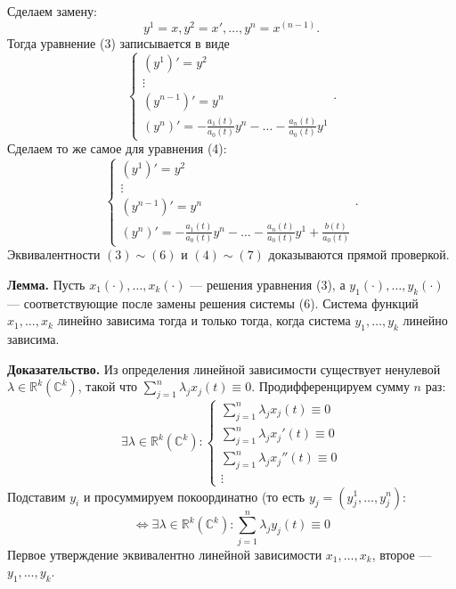 Сделаем замену: 
\begin{equation}
    y^1 = x, y^2 = x', \dots, y^n = x^{(n-1)}.
\end{equation}
Тогда уравнение (3) записывается в виде
\begin{equation}
    \begin{cases}
        (y^1)' = y^2 \\
        \vdots \\
        (y^{n-1})' = y^n \\
        (y^n)' = -\frac{a_1(t)}{a_0(t)}y^n - \dots - \frac{a_n(t)}{a_0(t)} y^1
    \end{cases} .
\end{equation}
Сделаем то же самое для уравнения (4):
\begin{equation}
    \begin{cases}
        (y^1)' = y^2 \\
        \vdots \\
        (y^{n-1})' = y^n \\
        (y^n)' = -\frac{a_1(t)}{a_0(t)}y^n - \dots - \frac{a_n(t)}{a_0(t)} y^1 + \frac{b(t)}{a_0(t)}
    \end{cases} .
\end{equation}
Эквивалентности $(3) \sim (6)$ и $(4) \sim (7)$ доказываются прямой проверкой.

\textbf{Лемма.} Пусть $x_1(\cdot), \dots, x_k(\cdot)$ --- решения уравнения (3), а $y_1(\cdot), \dots, y_k(\cdot)$ --- соответствующие после замены решения системы (6).
Система функций $x_1, \dots, x_k$ линейно зависима тогда и только тогда, когда система $y_1, \dots, y_k$ линейно зависима.

\textbf{Доказательство.} Из определения линейной зависимости существует ненулевой $\lambda \in \mathbb R^k (\mathbb C^k)$, такой что $\sum_{j=1}^{n} \lambda_j x_j (t) \equiv 0$.
Продифференцируем сумму $n$ раз:
\[
    \exists \lambda \in \mathbb R^k (\mathbb C^k):
    \begin{cases}
        \sum_{j=1}^{n} \lambda_j x_j(t) \equiv 0 \\
        \sum_{j=1}^{n} \lambda_j x_j'(t) \equiv 0 \\
        \sum_{j=1}^{n} \lambda_j x_j''(t) \equiv 0 \\
        \vdots
    \end{cases}
\]
Подставим $y_i$ и просуммируем покоординатно (то есть $y_j = (y_j^1, \dots, y_j^n)$:
\[
    \iff \exists \lambda \in \mathbb R^k (\mathbb C^k):
    \sum_{j=1}^{n} \lambda_j y_j(t) \equiv 0
\]
Первое утверждение эквивалентно линейной зависимости $x_1, \dots, x_k$, второе --- $y_1, \dots, y_k$.

